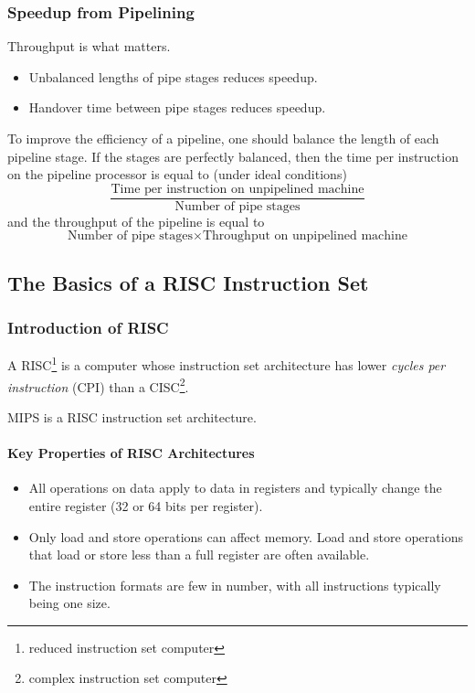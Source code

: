 \documentclass[12pt, a4paper]{article}
\theoremstyle{margin}
\begin{document}
    \subsubsection{Speedup from Pipelining}

      \indent 

      Throughput is what matters.

      \begin{itemize}
        \item Unbalanced lengths of pipe stages reduces speedup. 
        \item Handover time between pipe stages reduces speedup.
      \end{itemize}

      To improve the efficiency of a pipeline, one should balance the length of each pipeline stage. If the stages are perfectly balanced, then the time per instruction on the pipeline processor is equal to (under ideal conditions) 
      $$\frac{\text{Time per instruction on unpipelined machine}}{\text{Number of pipe stages}}$$ 
      and the throughput of the pipeline is equal to 
      $$\text{Number of pipe stages} \times \text{Throughput on unpipelined machine}$$

  \subsection{The Basics of a RISC Instruction Set}

    \subsubsection{Introduction of RISC}

      \indent 

      A RISC\footnote{reduced instruction set computer} is a computer whose instruction set architecture has lower \emph{cycles per instruction} (CPI) than a CISC\footnote{complex instruction set computer}.

      MIPS is a RISC instruction set architecture.

      \paragraph{Key Properties of RISC Architectures\cite{caqa}}
        \begin{itemize}
          \item All operations on data apply to data in registers and typically change the entire register (32 or 64 bits per register).
          \item Only load and store operations can affect memory. Load and store operations that load or store less than a full register are often available.
          \item The instruction formats are few in number, with all instructions typically being one size.
        \end{itemize}
\end{document}
